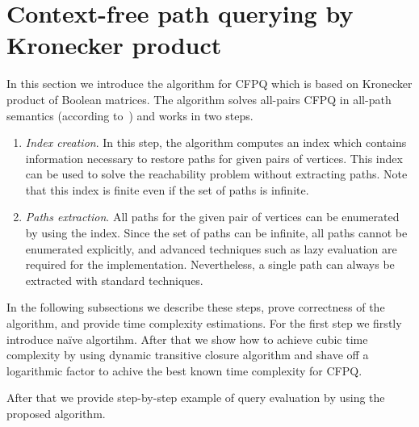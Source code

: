 \section{Context-free path querying by Kronecker product}


In this section we introduce the algorithm for CFPQ which is based on Kronecker product of Boolean matrices.
The algorithm solves all-pairs CFPQ in all-path semantics (according to~\cite{hellingsPathQuerying}) and works in two steps.
\begin{enumerate}
\item \emph{Index creation}.
 In this step, the algorithm computes an index which contains information necessary to restore paths for given pairs of vertices.
 This index can be used to solve the reachability problem without extracting paths.
 Note that this index is finite even if the set of paths is infinite.
\item \emph{Paths extraction}.
All paths for the given pair of vertices can be enumerated by using the index.
Since the set of paths can be infinite, all paths cannot be enumerated explicitly, and advanced techniques such as lazy evaluation are required for the implementation.
Nevertheless, a single path can always be extracted with standard techniques.
\end{enumerate}

In the following subsections we describe these steps, prove correctness of the algorithm, and provide time complexity estimations.
For the first step we firstly introduce na{\"i}ve algortihm. After that we show how to achieve cubic time complexity by using dynamic transitive closure algorithm and shave off a logarithmic factor to achive the best known time complexity for CFPQ.

After that we provide step-by-step example of query evaluation by using the proposed algorithm.




